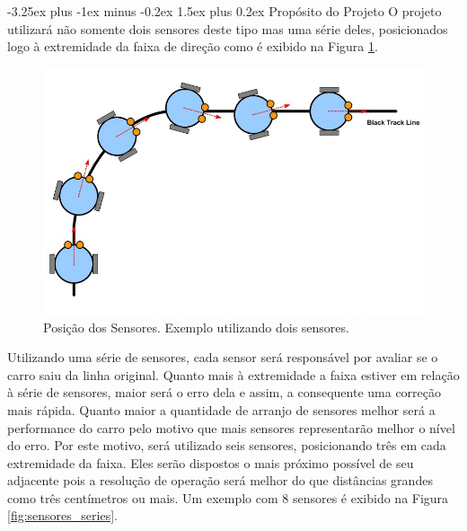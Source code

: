 \documentclass[portugues, brazil, a4paper,12pt]{article}
\makeatletter
\renewcommand{\paragraph}{\@startsection{paragraph}{4}{0ex}%
   {-3.25ex plus -1ex minus -0.2ex}%
   {1.5ex plus 0.2ex}%
   {\normalfont\normalsize\bfseries}}
\makeatother
\begin{document}
			\paragraph{Propósito do Projeto}
				O projeto utilizará não somente dois sensores deste tipo mas uma série deles, posicionados logo à extremidade da faixa de direção como é exibido na Figura \ref{fig:dois_sensores}.

				\begin{figure}[h]
					\centering
					\includegraphics[width=0.9\linewidth]{img/elementos-line_tracking.png}
					\caption{Posição dos Sensores. Exemplo utilizando dois sensores.}
					\label{fig:dois_sensores}
				\end{figure}

				Utilizando uma série de sensores, cada sensor será responsável por avaliar se o carro saiu da linha original. Quanto mais à extremidade a faixa estiver em relação à série de sensores, maior será o erro dela e assim, a consequente uma correção mais rápida. Quanto maior a quantidade de arranjo de sensores melhor será a performance do carro pelo motivo que mais sensores representarão melhor o nível do erro. Por este motivo, será utilizado seis sensores, posicionando três em cada extremidade da faixa. Eles serão dispostos o mais próximo possível de seu adjacente pois a resolução de operação será melhor do que distâncias grandes como três centímetros ou mais. Um exemplo com 8 sensores é exibido na Figura \ref{fig:sensores_series}.
\end{document}
